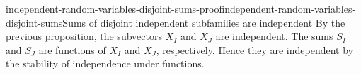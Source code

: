 \documentclass[preview]{standalone}
\begin{document}
\begin{snippetproof}{independent-random-variables-disjoint-sums-proof}{independent-random-variables-disjoint-sums}{Sums of disjoint independent subfamilies are independent}
    By the previous proposition, the subvectors \(X_I\) and \(X_J\) are
    independent. The sums \(S_I\) and \(S_J\) are functions of \(X_I\) and
    \(X_J\), respectively. Hence they are independent by the stability of
    independence under functions.
\end{snippetproof}
\end{document}
